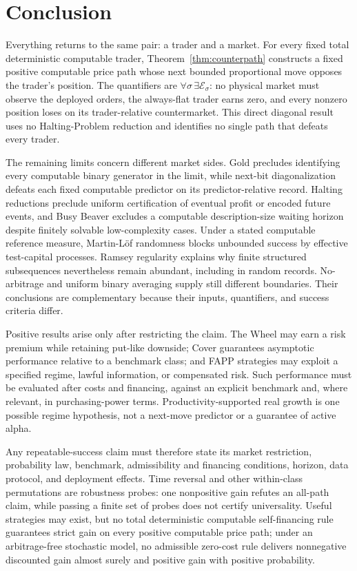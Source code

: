 \documentclass[aps,pra,reprint,superscriptaddress,amsmath,amssymb,floatfix]{revtex4-2}
\theoremstyle{plain}
\theoremstyle{definition}
\theoremstyle{remark}
\begin{document}
\section{Conclusion}
\label{sec:conclusion}

Everything returns to the same pair: a trader and a market. For every fixed
total deterministic computable trader, Theorem~\ref{thm:counterpath} constructs
a fixed positive computable price path whose next bounded proportional move
opposes the trader's position. The quantifiers are
\(\forall\sigma\,\exists\mathcal E_\sigma\): no physical market must observe
the deployed orders, the always-flat trader earns zero, and every nonzero
position loses on its trader-relative countermarket. This direct diagonal
result uses no Halting-Problem reduction and identifies no single path that
defeats every trader.

The remaining limits concern different market sides. Gold precludes identifying
every computable binary generator in the limit, while next-bit diagonalization
defeats each fixed computable predictor on its predictor-relative record.
Halting reductions preclude uniform certification of eventual profit or encoded
future events, and Busy Beaver excludes a computable description-size waiting
horizon despite finitely solvable low-complexity cases. Under a stated
computable reference measure, Martin-L\"of randomness blocks unbounded success
by effective test-capital processes. Ramsey regularity explains why finite
structured subsequences nevertheless remain abundant, including in random
records. No-arbitrage and uniform binary averaging supply still different
boundaries. Their conclusions are complementary because their inputs,
quantifiers, and success criteria differ.

Positive results arise only after restricting the claim. The Wheel may earn a
risk premium while retaining put-like downside; Cover guarantees asymptotic
performance relative to a benchmark class; and FAPP strategies may exploit a
specified regime, lawful information, or compensated risk. Such performance
must be evaluated after costs and financing, against an explicit benchmark and,
where relevant, in purchasing-power terms. Productivity-supported real growth
is one possible regime hypothesis, not a next-move predictor or a guarantee of
active alpha.

Any repeatable-success claim must therefore state its market restriction,
probability law, benchmark, admissibility and financing conditions, horizon,
data protocol, and deployment effects. Time reversal and other within-class
permutations are robustness probes: one nonpositive gain refutes an all-path
claim, while passing a finite set of probes does not certify universality.
Useful strategies may exist, but no total deterministic computable
self-financing rule guarantees strict gain on every positive computable price
path; under an arbitrage-free stochastic model, no admissible zero-cost rule
delivers nonnegative discounted gain almost surely and positive gain with
positive probability.
\end{document}
